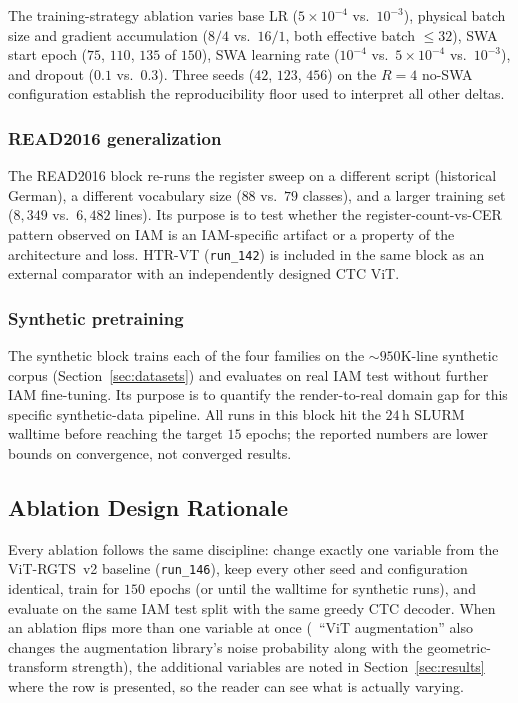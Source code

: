 The training-strategy ablation varies base LR ($5 \times 10^{-4}$ vs.\ $10^{-3}$), physical batch size and gradient accumulation ($8/4$ vs.\ $16/1$, both effective batch $\leq 32$), SWA start epoch ($75$, $110$, $135$ of $150$), SWA learning rate ($10^{-4}$ vs.\ $5 \times 10^{-4}$ vs.\ $10^{-3}$), and dropout ($0.1$ vs.\ $0.3$). Three seeds ($42$, $123$, $456$) on the $R = 4$ no-SWA configuration establish the reproducibility floor used to interpret all other deltas.

\subsubsection{READ2016 generalization}

The READ2016 block re-runs the register sweep on a different script (historical German), a different vocabulary size ($88$ vs.\ $79$ classes), and a larger training set ($8{,}349$ vs.\ $6{,}482$ lines). Its purpose is to test whether the register-count-vs-CER pattern observed on IAM is an IAM-specific artifact or a property of the architecture and loss. HTR-VT (\texttt{run\_142}) is included in the same block as an external comparator with an independently designed CTC ViT.

\subsubsection{Synthetic pretraining}

The synthetic block trains each of the four families on the ${\sim}950$K-line synthetic corpus (Section~\ref{sec:datasets}) and evaluates on real IAM test without further IAM fine-tuning. Its purpose is to quantify the render-to-real domain gap for this specific synthetic-data pipeline. All runs in this block hit the $24$\,h SLURM walltime before reaching the target $15$ epochs; the reported numbers are lower bounds on convergence, not converged results.

\subsection{Ablation Design Rationale}
\label{sec:abl_rationale}

Every ablation follows the same discipline: change exactly one variable from the ViT-RGTS~v2 baseline (\texttt{run\_146}), keep every other seed and configuration identical, train for $150$ epochs (or until the walltime for synthetic runs), and evaluate on the same IAM test split with the same greedy CTC decoder. When an ablation flips more than one variable at once (\eg\ ``ViT augmentation'' also changes the augmentation library's noise probability along with the geometric-transform strength), the additional variables are noted in Section~\ref{sec:results} where the row is presented, so the reader can see what is actually varying.

